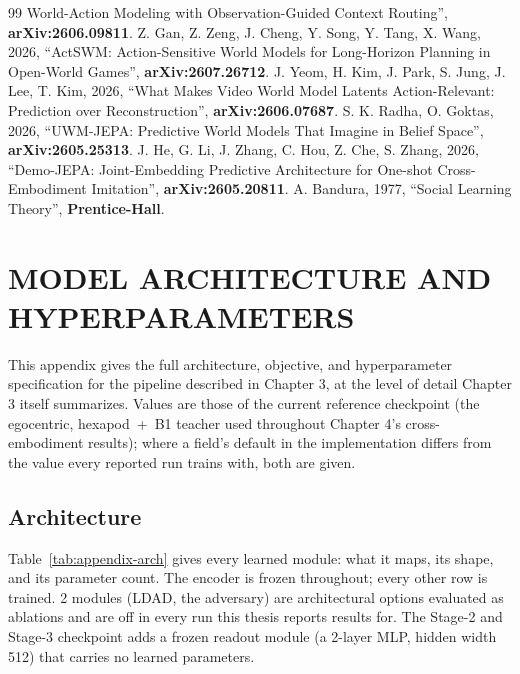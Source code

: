 \documentclass[12pt,a4paper,oneside]{report}
\begin{document}
\begin{thebibliography}{99}
    World-Action Modeling with Observation-Guided Context Routing'', \textbf{arXiv:2606.09811}.
   Z. Gan, Z. Zeng, J. Cheng, Y. Song, Y. Tang, X. Wang, 2026, ``ActSWM: Action-Sensitive
    World Models for Long-Horizon Planning in Open-World Games'', \textbf{arXiv:2607.26712}.
   J. Yeom, H. Kim, J. Park, S. Jung, J. Lee, T. Kim, 2026, ``What Makes Video World Model
    Latents Action-Relevant: Prediction over Reconstruction'', \textbf{arXiv:2606.07687}.
   S. K. Radha, O. Goktas, 2026, ``UWM-JEPA: Predictive World Models That Imagine in
    Belief Space'', \textbf{arXiv:2605.25313}.
   J. He, G. Li, J. Zhang, C. Hou, Z. Che, S. Zhang, 2026, ``Demo-JEPA:
    Joint-Embedding Predictive Architecture for One-shot Cross-Embodiment Imitation'', \textbf{arXiv:2605.20811}.
   A. Bandura, 1977, ``Social Learning Theory'', \textbf{Prentice-Hall}.
\end{thebibliography}

\appendix
\renewcommand{\chaptername}{Appendix}
\chapter{MODEL ARCHITECTURE AND HYPERPARAMETERS}

This appendix gives the full architecture, objective, and hyperparameter specification for the
pipeline described in Chapter 3, at the level of detail Chapter 3 itself summarizes. Values are those
of the current reference checkpoint (the egocentric, hexapod~+~B1 teacher used throughout Chapter 4's
cross-embodiment results); where a field's default in the implementation differs from the value every
reported run trains with, both are given.

\section{Architecture}
Table~\ref{tab:appendix-arch} gives every learned module: what it maps, its shape, and its parameter
count. The encoder is frozen throughout; every other row is trained. 2 modules (LDAD, the
adversary) are architectural options evaluated as ablations and are off in every run this thesis
reports results for. The Stage-2 and Stage-3 checkpoint adds a frozen readout module (a 2-layer MLP, hidden width
512) that carries no learned parameters.
\end{document}
